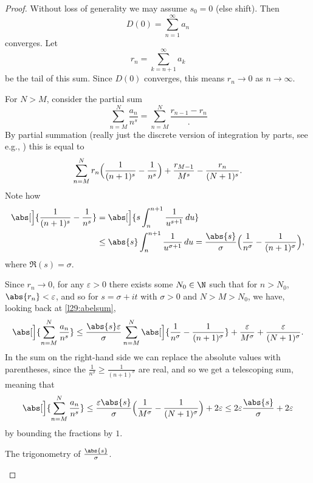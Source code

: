 \begin{proof}
	Without loss of generality we may assume $s_0 = 0$ (else shift).
	Then
	\[
		D(0) = \sum_{n = 1}^\infty a_n
	\]
	converges.
	Let
	\[
		r_n = \sum_{k = n + 1}^\infty a_k
	\]
	be the tail of this sum.
	Since $D(0)$ converges, this means $r_n \to 0$ as $n \to \infty$.

	For $N > M$, consider the partial sum
	\[
		\sum_{n = M}^N \frac{a_n}{n^s} = \sum_{n = M}^N \frac{r_{n - 1} - r_n}.
	\]
	By partial summation (really just the discrete version of integration by parts, see e.g., \cite[Chapter~3]{tomapostol2010}) this is equal to
	\begin{equation}\label{l29:abelsum}
		\sum_{n = M}^N r_n \Bigl( \frac{1}{(n + 1)^s} - \frac{1}{n^s} \Bigr) + \frac{r_{M - 1}}{M^s} - \frac{r_n}{(N + 1)^s}.
	\end{equation}
	Note how
	\begin{align*}
		\abs[\Big]{\frac{1}{(n + 1)^s} - \frac{1}{n^s}} &= \abs[\Big]{s \int_n^{n + 1} \frac{1}{u^{s + 1}} \, d u} \\
		&\leq \abs{s} \int_{n}^{n + 1} \frac{1}{u^{\sigma + 1}} \, d u = \frac{\abs{s}}{\sigma} \Bigl( \frac{1}{n^\sigma} - \frac{1}{(n + 1)^\sigma} \Bigr),
	\end{align*}
	where $\Re(s) = \sigma$.

	Since $r_n \to 0$, for any $\varepsilon > 0$ there exists some $N_0 \in \N$ such that for $n > N_0$, $\abs{r_n} < \varepsilon$, and so for $s = \sigma + i t$ with $\sigma > 0$ and $N > M > N_0$, we have, looking back at \autoref{l29:abelsum},
	\[
		\abs[\Big]{\sum_{n = M}^N \frac{a_n}{n^s}} \leq \frac{\abs{s} \varepsilon}{\sigma} \sum_{n = M}^N \abs[\Big]{\frac{1}{n^\sigma} - \frac{1}{(n + 1)^\sigma}} + \frac{\varepsilon}{M^\sigma} + \frac{\varepsilon}{(N + 1)^\sigma}.
	\]
	In the sum on the right-hand side we can replace the absolute values with parentheses, since the $\frac{1}{n^\sigma} \geq \frac{1}{(n + 1)^\sigma}$ are real, and so we get a telescoping sum, meaning that
	\[
		\abs[\Big]{\sum_{n = M}^N \frac{a_n}{n^s}} \leq \frac{\varepsilon \abs{s}}{\sigma} \Bigl( \frac{1}{M^\sigma} - \frac{1}{(N + 1)^\sigma} \Bigr) + 2 \varepsilon \leq 2 \varepsilon \frac{\abs{s}}{\sigma} + 2 \varepsilon
	\]
	by bounding the fractions by $1$.

	\begin{marginfigure}
		\centering

		\caption{\label{l29:fig12.2b} The trigonometry of $\frac{\abs{s}}{\sigma}$.}
	\end{marginfigure}


\end{proof}
